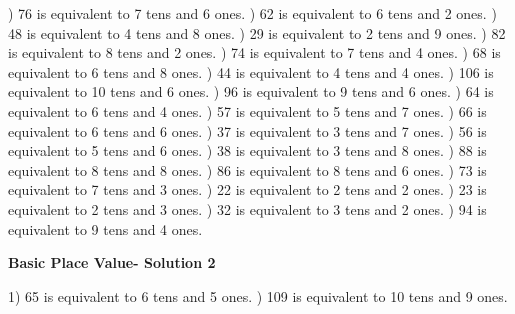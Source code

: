 \documentclass{article}%
\begin{document}
) 76 is equivalent to  7 tens and 6 ones.%
) 62 is equivalent to  6 tens and 2 ones.%
) 48 is equivalent to  4 tens and 8 ones.%
) 29 is equivalent to  2 tens and 9 ones.%
) 82 is equivalent to  8 tens and 2 ones.%
) 74 is equivalent to  7 tens and 4 ones.%
) 68 is equivalent to  6 tens and 8 ones.%
) 44 is equivalent to  4 tens and 4 ones.%
) 106 is equivalent to  10 tens and 6 ones.%
) 96 is equivalent to  9 tens and 6 ones.%
) 64 is equivalent to  6 tens and 4 ones.%
) 57 is equivalent to  5 tens and 7 ones.%
) 66 is equivalent to  6 tens and 6 ones.%
) 37 is equivalent to  3 tens and 7 ones.%
) 56 is equivalent to  5 tens and 6 ones.%
) 38 is equivalent to  3 tens and 8 ones.%
) 88 is equivalent to  8 tens and 8 ones.%
) 86 is equivalent to  8 tens and 6 ones.%
) 73 is equivalent to  7 tens and 3 ones.%
) 22 is equivalent to  2 tens and 2 ones.%
) 23 is equivalent to  2 tens and 3 ones.%
) 32 is equivalent to  3 tens and 2 ones.%
) 94 is equivalent to  9 tens and 4 ones.%
\newline%
\newpage%
\large%
\begin{center}%
\textbf{Basic Place Value- Solution 2}%
\newline%
\end{center} \normalsize%
1) 65 is equivalent to  6 tens and 5 ones.%
) 109 is equivalent to  10 tens and 9 ones.%
\end{document}
